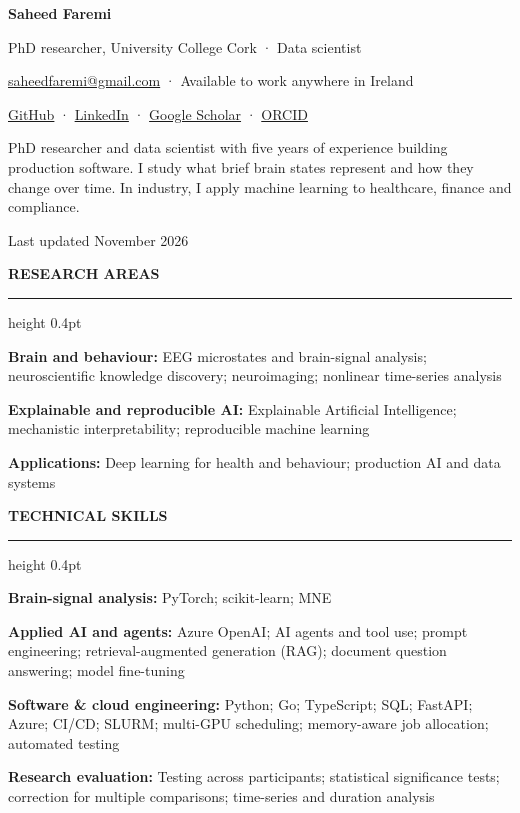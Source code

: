 \documentclass[11pt]{article}
\newcommand{\cvsection}[1]{%
  \par\vspace{5pt}%
  {\fontsize{11.5pt}{13pt}\selectfont\bfseries\MakeUppercase{#1}\par}%
  \nobreak\vspace{2pt}\hrule height 0.4pt\nobreak\vspace{2pt}%
}
\newcommand{\skill}[2]{\noindent\textbf{#1:} #2\par}
\begin{document}
\begin{center}
  {\fontsize{20pt}{23pt}\selectfont\textbf{Saheed Faremi}\par}
  \vspace{2pt}
  PhD researcher, University College Cork · Data scientist\par
  \vspace{2pt}
  \href{mailto:saheedfaremi@gmail.com}{saheedfaremi@gmail.com} · Available to work anywhere in Ireland\par
  \href{https://github.com/fayisode}{GitHub} ·
  \href{https://www.linkedin.com/in/faremi-saheed}{LinkedIn} ·
  \href{https://scholar.google.com/citations?user=tw1P0nsAAAAJ}{Google Scholar} ·
  \href{https://orcid.org/0009-0007-8428-7019}{ORCID}\par
\end{center}
\vspace{2pt}
PhD researcher and data scientist with five years of experience building production software. I study what brief brain states represent and how they change over time. In industry, I apply machine learning to healthcare, finance and compliance.\par
{\small Last updated November 2026\par}

\cvsection{Research areas}
\skill{Brain and behaviour}{EEG microstates and brain-signal analysis; neuroscientific knowledge discovery; neuroimaging; nonlinear time-series analysis}
\vspace{1.5pt}
\skill{Explainable and reproducible AI}{Explainable Artificial Intelligence; mechanistic interpretability; reproducible machine learning}
\vspace{1.5pt}
\skill{Applications}{Deep learning for health and behaviour; production AI and data systems}

\cvsection{Technical skills}
\skill{Brain-signal analysis}{PyTorch; scikit-learn; MNE}
\vspace{1.5pt}
\skill{Applied AI and agents}{Azure OpenAI; AI agents and tool use; prompt engineering; retrieval-augmented generation (RAG); document question answering; model fine-tuning}
\vspace{1.5pt}
\skill{Software \& cloud engineering}{Python; Go; TypeScript; SQL; FastAPI; Azure; CI/CD; SLURM; multi-GPU scheduling; memory-aware job allocation; automated testing}
\vspace{1.5pt}
\skill{Research evaluation}{Testing across participants; statistical significance tests; correction for multiple comparisons; time-series and duration analysis}
\end{document}
